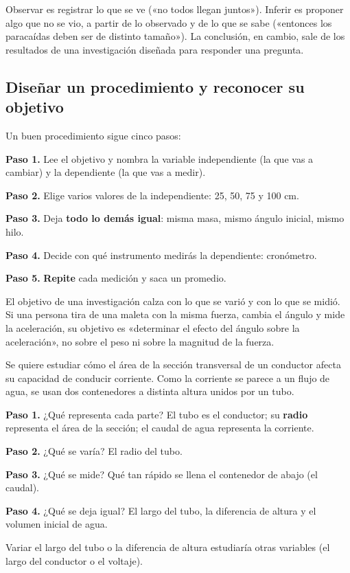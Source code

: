 \begin{clave}[{Recuerda}] Observar es registrar lo que se ve («no todos llegan juntos»). Inferir es proponer algo que no se vio, a partir de lo observado y de lo que se sabe («entonces los paracaídas deben ser de distinto tamaño»). La conclusión, en cambio, sale de los resultados de una investigación diseñada para responder una pregunta.\end{clave}
\subsection{Diseñar un procedimiento y reconocer su objetivo}
Un buen procedimiento sigue cinco pasos:

 

\textbf{Paso 1.} Lee el objetivo y nombra la variable independiente (la que vas a cambiar) y la dependiente (la que vas a medir).

 

\textbf{Paso 2.} Elige varios valores de la independiente: 25, 50, 75 y 100 cm.

 

\textbf{Paso 3.} Deja \textbf{todo lo demás igual}: misma masa, mismo ángulo inicial, mismo hilo.

 

\textbf{Paso 4.} Decide con qué instrumento medirás la dependiente: cronómetro.

 

\textbf{Paso 5.} \textbf{Repite} cada medición y saca un promedio.

 
\begin{clave}[{Recuerda}] El objetivo de una investigación calza con lo que se varió y con lo que se midió. Si una persona tira de una maleta con la misma fuerza, cambia el ángulo y mide la aceleración, su objetivo es «determinar el efecto del ángulo sobre la aceleración», no sobre el peso ni sobre la magnitud de la fuerza.\end{clave}
  
\begin{ejemplo} Se quiere estudiar cómo el área de la sección transversal de un conductor afecta su capacidad de conducir corriente. Como la corriente se parece a un flujo de agua, se usan dos contenedores a distinta altura unidos por un tubo.\par \textbf{Paso 1.} ¿Qué representa cada parte? El tubo es el conductor; su \textbf{radio} representa el área de la sección; el caudal de agua representa la corriente.\par \textbf{Paso 2.} ¿Qué se varía? El radio del tubo.\par \textbf{Paso 3.} ¿Qué se mide? Qué tan rápido se llena el contenedor de abajo (el caudal).\par \textbf{Paso 4.} ¿Qué se deja igual? El largo del tubo, la diferencia de altura y el volumen inicial de agua.\par Variar el largo del tubo o la diferencia de altura estudiaría otras variables (el largo del conductor o el voltaje).\end{ejemplo}
